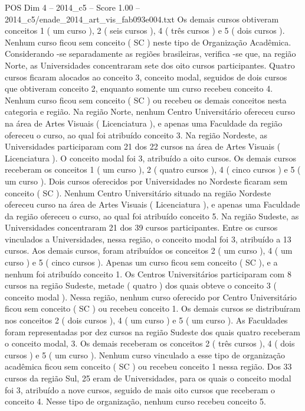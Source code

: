 \begin{textsample}{POS Dim 4 – 2014\_c5 – Score 1.00 – 2014\_c5/enade\_2014\_art\_vis\_fab093e004.txt}
Os demais cursos obtiveram conceitos 1 ( um curso ), 2 ( seis cursos ), 4 ( três cursos ) e 5 ( dois cursos ).
Nenhum curso ficou sem conceito ( SC ) neste tipo de Organização Acadêmica.
Considerando -se separadamente as regiões brasileiras, verifica -se que, na região Norte, as Universidades concentraram sete dos oito cursos participantes.
Quatro cursos ficaram alocados ao conceito 3, conceito modal, seguidos de dois cursos que obtiveram conceito 2, enquanto somente um curso recebeu conceito 4.
Nenhum curso ficou sem conceito ( SC ) ou recebeu os demais conceitos nesta categoria e região.
Na região Norte, nenhum Centro Universitário ofereceu curso na área de Artes Visuais ( Licenciatura ), e apenas uma Faculdade da região ofereceu o curso, ao qual foi atribuído conceito 3.
Na região Nordeste, as Universidades participaram com 21 dos 22 cursos na área de Artes Visuais ( Licenciatura ).
O conceito modal foi 3, atribuído a oito cursos.
Os demais cursos receberam os conceitos 1 ( um curso ), 2 ( quatro cursos ), 4 ( cinco cursos ) e 5 ( um curso ).
Dois cursos oferecidos por Universidades no Nordeste ficaram sem conceito ( SC ).
Nenhum Centro Universitário situado na região Nordeste ofereceu curso na área de Artes Visuais ( Licenciatura ), e apenas uma Faculdade da região ofereceu o curso, ao qual foi atribuído conceito 5.
Na região Sudeste, as Universidades concentraram 21 dos 39 cursos participantes.
Entre os cursos vinculados a Universidades, nessa região, o conceito modal foi 3, atribuído a 13 cursos.
Aos demais cursos, foram atribuídos os conceitos 2 ( um curso ), 4 ( um curso ) e 5 ( cinco cursos ).
Apenas um curso ficou sem conceito ( SC ), e a nenhum foi atribuído conceito 1.
Os Centros Universitários participaram com 8 cursos na região Sudeste, metade ( quatro ) dos quais obteve o conceito 3 ( conceito modal ).
Nessa região, nenhum curso oferecido por Centro Universitário ficou sem conceito ( SC ) ou recebeu conceito 1.
Os demais cursos se distribuíram nos conceitos 2 ( dois cursos ), 4 ( um curso ) e 5 ( um curso ).
As Faculdades foram representadas por dez cursos na região Sudeste dos quais quatro receberam o conceito modal, 3.
Os demais receberam os conceitos 2 ( três cursos ), 4 ( dois cursos ) e 5 ( um curso ).
Nenhum curso vinculado a esse tipo de organização acadêmica ficou sem conceito ( SC ) ou recebeu conceito 1 nessa região.
Dos 33 cursos da região Sul, 25 eram de Universidades, para os quais o conceito modal foi 3, atribuído a nove cursos, seguido de mais oito cursos que receberam o conceito 4.
Nesse tipo de organização, nenhum curso recebeu conceito 5.

\end{textsample}
